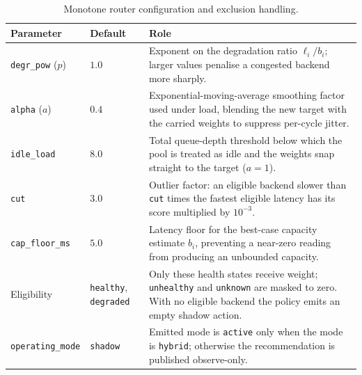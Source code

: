 \begin{table}[htbp]
  \centering
  \caption[Monotone router configuration]{Monotone router configuration and exclusion handling.}
  \label{bm:tab:mono-params}
  \small
  \begin{tabularx}{\linewidth}{@{}l l Y@{}}
    \toprule
    \textbf{Parameter} & \textbf{Default} & \textbf{Role} \\
    \midrule
    \texttt{degr\_pow} ($p$) & $1.0$
      & Exponent on the degradation ratio $\ell_i/b_i$; larger values penalise a
        congested backend more sharply. \\
    \addlinespace
    \texttt{alpha} ($a$) & $0.4$
      & Exponential-moving-average smoothing factor used under load, blending the
        new target with the carried weights to suppress per-cycle jitter. \\
    \addlinespace
    \texttt{idle\_load} & $8.0$
      & Total queue-depth threshold below which the pool is treated as idle and the
        weights snap straight to the target ($a = 1$). \\
    \addlinespace
    \texttt{cut} & $3.0$
      & Outlier factor: an eligible backend slower than \texttt{cut} times the
        fastest eligible latency has its score multiplied by $10^{-3}$. \\
    \addlinespace
    \texttt{cap\_floor\_ms} & $5.0$
      & Latency floor for the best-case capacity estimate $b_i$, preventing a
        near-zero reading from producing an unbounded capacity. \\
    \addlinespace
    Eligibility & \texttt{healthy}, \texttt{degraded}
      & Only these health states receive weight; \texttt{unhealthy} and
        \texttt{unknown} are masked to zero. With no eligible backend the policy
        emits an empty shadow action. \\
    \addlinespace
    \texttt{operating\_mode} & \texttt{shadow}
      & Emitted mode is \texttt{active} only when the mode is \texttt{hybrid};
        otherwise the recommendation is published observe-only. \\
    \bottomrule
  \end{tabularx}
\end{table}
